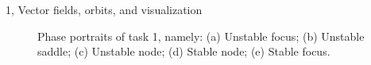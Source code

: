 \documentclass[10pt,a4paper]{article}
\begin{document}
\begin{task}{1, Vector fields, orbits, and visualization}
\begin{figure}[H]
    \centering
    \hfill
    \hfill
    \vfill
    \caption{Phase portraits of task 1, namely:
    (a) Unstable focus;
    (b) Unstable saddle;
    (c) Unstable node;
    (d) Stable node;
    (e) Stable focus.}
    \label{fig:task1-phase-portraits}
\end{figure}
\end{task}
\end{document}

